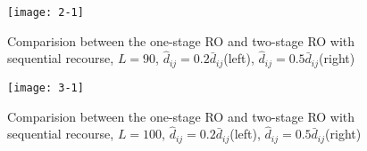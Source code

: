 \documentclass[preprint,review,10pt,round,authoryear]{elsarticle}\usepackage[]{graphicx}\usepackage[]{color}
\makeatletter
\def\maxwidth{ %
  \ifdim\Gin@nat@width>\linewidth
    \linewidth
  \else
    \Gin@nat@width
  \fi
}
\newenvironment{knitrout}{}{} %
\theoremstyle{plain}
\theoremstyle{definition}
\theoremstyle{remark}
\makeatother
\begin{document}
\begin{knitrout}
\color{fgcolor}\begin{figure}[!h]

{\centering \texttt{[image: 2-1]} 

}

\caption{Comparision between the one-stage RO and two-stage RO with sequential recourse, $L=90$, $\hat{d}_{ij}= 0.2\bar{d}_{ij} $(left), $\hat{d}_{ij}= 0.5\bar{d}_{ij} $(right)}\label{fig:2}
\end{figure}


\end{knitrout}

\begin{knitrout}
\color{fgcolor}\begin{figure}[!h]

{\centering \texttt{[image: 3-1]} 

}

\caption{Comparision between the one-stage RO and two-stage RO with sequential recourse, $L=100$, $\hat{d}_{ij}= 0.2\bar{d}_{ij} $(left), $\hat{d}_{ij}= 0.5\bar{d}_{ij} $(right)}\label{fig:3}
\end{figure}


\end{knitrout}
\end{document}
